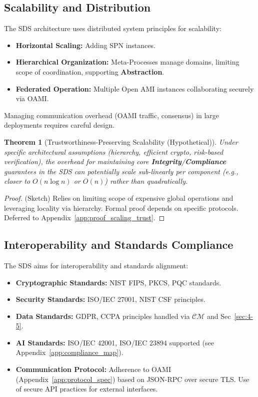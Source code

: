\documentclass[12pt,a4paper]{report}
\newtheorem{theorem}{Theorem}[section]
\newcommand{\Integrity}{\textbf{Integrity}}
\newcommand{\Abstraction}{\textbf{Abstraction}}
\begin{document}
	\subsection{Scalability and Distribution} %
	\label{sec:4-6-2} %
	
	The SDS architecture uses distributed system principles for scalability:
	\begin{itemize}[noitemsep]
		\item \textbf{Horizontal Scaling:} Adding SPN instances.
		\item \textbf{Hierarchical Organization:} Meta-Processes manage domains, limiting scope of coordination, supporting \Abstraction.
		\item \textbf{Federated Operation:} Multiple Open AMI instances collaborating securely via OAMI.
	\end{itemize}
	Managing communication overhead (OAMI traffic, consensus) in large deployments requires careful design.
	
	\begin{theorem}[Trustworthiness-Preserving Scalability (Hypothetical)]
		\label{thm:scaling_trust}
		Under specific architectural assumptions (hierarchy, efficient crypto, risk-based verification), the overhead for maintaining core \Integrity/\textbf{Compliance} guarantees in the SDS can potentially scale sub-linearly per component (e.g., closer to $O(n \log n)$ or $O(n)$) rather than quadratically.
	\end{theorem}
	\begin{proof} (Sketch) Relies on limiting scope of expensive global operations and leveraging locality via hierarchy. Formal proof depends on specific protocols. Deferred to Appendix~\ref{app:proof_scaling_trust}. \end{proof}
	
	\subsection{Interoperability and Standards Compliance} %
	\label{sec:4-6-3} %
	
	The SDS aims for interoperability and standards alignment:
	\begin{itemize}[noitemsep]
		\item \textbf{Cryptographic Standards:} NIST FIPS, PKCS, PQC standards.
		\item \textbf{Security Standards:} ISO/IEC 27001, NIST CSF principles.
		\item \textbf{Data Standards:} GDPR, CCPA principles handled via $\mathcal{CM}$ and Sec~\ref{sec:4-5}.
		\item \textbf{AI Standards:} ISO/IEC 42001, ISO/IEC 23894 supported (see Appendix~\ref{app:compliance_map}).
		\item \textbf{Communication Protocol:} Adherence to OAMI (Appendix~\ref{app:protocol_spec}) based on JSON-RPC over secure TLS. Use of secure API practices for external interfaces.
	\end{itemize}
	
\end{document}
